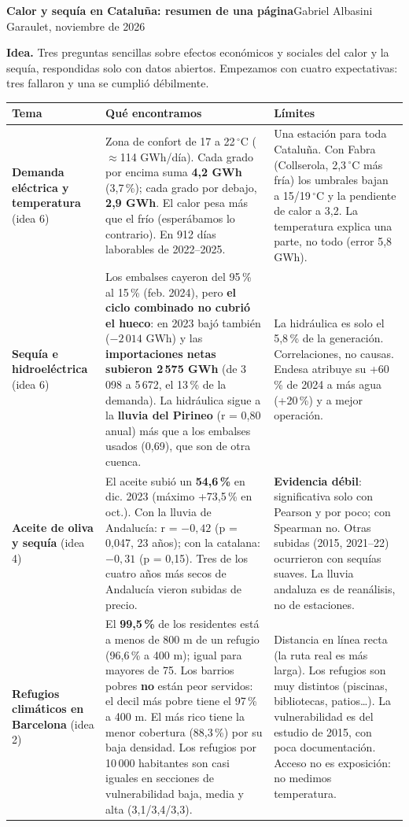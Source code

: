 \documentclass[10pt,a4paper]{article}
\begin{document}
{\large\textbf{Calor y sequ\'ia en Catalu\~na: resumen de una p\'agina}}\hfill{\small Gabriel Albasini Garaulet, noviembre de 2026}

\smallskip
\textbf{Idea.} Tres preguntas sencillas sobre efectos econ\'omicos y sociales del calor y la sequ\'ia, respondidas solo con datos abiertos. Empezamos con cuatro expectativas: tres fallaron y una se cumpli\'o d\'ebilmente.

\smallskip
\small
\begin{tabularx}{\linewidth}{@{}p{2.1cm}YY@{}}
\toprule
\textbf{Tema} & \textbf{Qu\'e encontramos} & \textbf{L\'imites} \\
\midrule
\textbf{Demanda el\'ectrica y temperatura} (idea 6)
& Zona de confort de 17 a 22\,$^\circ$C (\(\approx\)114 GWh/d\'ia). Cada grado por encima suma \textbf{4,2 GWh} (3,7\,\%); cada grado por debajo, \textbf{2,9 GWh}. El calor pesa m\'as que el fr\'io (esper\'abamos lo contrario). En 912 d\'ias laborables de 2022--2025.
& Una estaci\'on para toda Catalu\~na. Con Fabra (Collserola, 2,3\,$^\circ$C m\'as fr\'ia) los umbrales bajan a 15/19\,$^\circ$C y la pendiente de calor a 3,2. La temperatura explica una parte, no todo (error 5,8 GWh). \\
\addlinespace
\textbf{Sequ\'ia e hidroel\'ectrica} (idea 6)
& Los embalses cayeron del 95\,\% al 15\,\% (feb. 2024), pero \textbf{el ciclo combinado no cubri\'o el hueco}: en 2023 baj\'o tambi\'en (\(-2\,014\) GWh) y las \textbf{importaciones netas subieron 2\,575 GWh} (de 3\,098 a 5\,672, el 13\,\% de la demanda). La hidr\'aulica sigue a la \textbf{lluvia del Pirineo} (r = 0,80 anual) m\'as que a los embalses usados (0,69), que son de otra cuenca.
& La hidr\'aulica es solo el 5,8\,\% de la generaci\'on. Correlaciones, no causas. Endesa atribuye su +60\,\% de 2024 a m\'as agua (+20\,\%) y a mejor operaci\'on. \\
\addlinespace
\textbf{Aceite de oliva y sequ\'ia} (idea 4)
& El aceite subi\'o un \textbf{54,6\,\%} en dic. 2023 (m\'aximo +73,5\,\% en oct.). Con la lluvia de Andaluc\'ia: r = \(-0{,}42\) (p = 0,047, 23 a\~nos); con la catalana: \(-0{,}31\) (p = 0,15). Tres de los cuatro a\~nos m\'as secos de Andaluc\'ia vieron subidas de precio.
& \textbf{Evidencia d\'ebil}: significativa solo con Pearson y por poco; con Spearman no. Otras subidas (2015, 2021--22) ocurrieron con sequ\'ias suaves. La lluvia andaluza es de rean\'alisis, no de estaciones. \\
\addlinespace
\textbf{Refugios clim\'aticos en Barcelona} (idea 2)
& El \textbf{99,5\,\%} de los residentes est\'a a menos de 800 m de un refugio (96,6\,\% a 400 m); igual para mayores de 75. Los barrios pobres \textbf{no} est\'an peor servidos: el decil m\'as pobre tiene el 97\,\% a 400 m. El m\'as rico tiene la menor cobertura (88,3\,\%) por su baja densidad. Los refugios por 10\,000 habitantes son casi iguales en secciones de vulnerabilidad baja, media y alta (3,1/3,4/3,3).
& Distancia en l\'inea recta (la ruta real es m\'as larga). Los refugios son muy distintos (piscinas, bibliotecas, patios\ldots). La vulnerabilidad es del estudio de 2015, con poca documentaci\'on. Acceso no es exposici\'on: no medimos temperatura. \\
\bottomrule
\end{tabularx}
\end{document}
